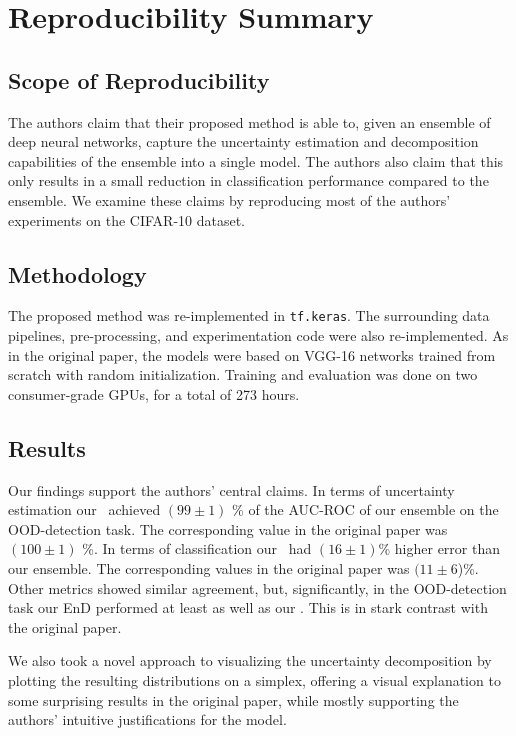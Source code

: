 \section*{\centering Reproducibility Summary}



\subsection*{Scope of Reproducibility}

The authors claim that their proposed method is able to, given an ensemble of deep neural networks, capture the uncertainty estimation and decomposition capabilities of the ensemble into a single model. The authors also claim that this only results in a small reduction in classification performance compared to the ensemble. We examine these claims by reproducing most of the authors' experiments on the CIFAR-10 dataset.

\subsection*{Methodology}

The proposed method was re-implemented in \texttt{tf.keras}. The surrounding data pipelines, pre-processing, and experimentation code were also re-implemented. As in the original paper, the models were based on VGG-16 networks trained from scratch with random initialization. Training and evaluation was done on two consumer-grade GPUs, for a total of 273 hours. 

\subsection*{Results}

Our findings support the authors' central claims. In terms of uncertainty estimation our \EnDD \ achieved $(99\pm 1)$ \% of the AUC-ROC of our ensemble on the OOD-detection task.  The corresponding value in the original paper was $(100\pm 1)$ \%. In terms of classification our \EnDD \ had $(16\pm1)$\% higher error than our ensemble. The corresponding values in the original paper was $(11 \pm 6$)\%.   Other metrics showed similar agreement, but, significantly, in the OOD-detection task our EnD performed at least as well as our \EnDD. This is in stark contrast with the original paper.  

We also took a novel approach to visualizing the uncertainty decomposition by plotting the resulting distributions on a simplex, offering a visual explanation to some surprising results in the original paper, while mostly supporting the authors' intuitive justifications for the model.


